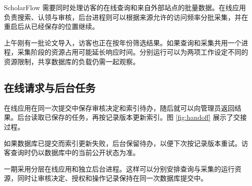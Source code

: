 \documentclass{scholarflow-report}
\begin{document}
\MakeReportCover

ScholarFlow 需要同时处理访客的在线查询和来自外部站点的批量数据。在线应用负责搜索、认领与审核，后台进程则可以根据来源允许的访问频率分批采集，并在重启后从已经保存的位置继续。

\begin{ReportContext}
上午刚有一批论文导入，访客也正在按年份筛选结果。如果查询和采集共用一个进程，采集阶段的资源占用可能延长响应时间。分别运行可以为两项工作设定不同的资源限制，共享数据库的负载仍需一起观察。
\end{ReportContext}

\subsection{在线请求与后台任务}
在线应用在同一次提交中保存审核决定和索引待办，随后就可以向管理员返回结果。后台读取已保存的任务，再按记录版本更新索引。图 \ref{fig:handoff} 展示了交接过程。

\begin{ReportFigure}
  \caption{在线应用与后台进程的任务交接}
  \label{fig:handoff}
\end{ReportFigure}

\begin{ReportIncident}
如果数据库已提交而索引更新失败，后台保留待办，以便下次按记录版本重试。访客查询时仍以数据库中的当前公开状态为准。
\end{ReportIncident}

\begin{ReportDecision}
一期采用分层在线应用和独立后台进程。这样可以分别安排查询与采集的运行资源，同时让审核决定、授权和操作记录保持在同一次数据库提交中。
\end{ReportDecision}
\end{document}
